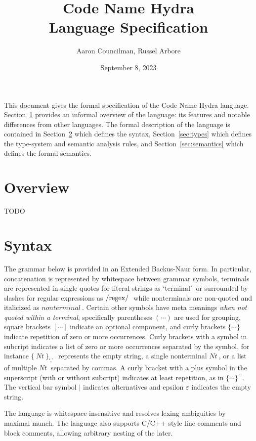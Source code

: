 \documentclass[letterpaper]{article}
\title{Code Name Hydra \\ \large Language Specification}
\author{Aaron Councilman, Russel Arbore}
\date{September 8, 2023}
\newcommand{\nonterminal}[1]{#1\ }
\newcommand{\terminal}[1]{\text{`#1'}\ }
\newcommand{\regex}[1]{\text{\lstinline$/#1/$}\ }
\newcommand*{\gramRepeat}[2][]{\{\ #2\}_{#1}\ }
\begin{document}
\maketitle

This document gives the formal specification of the Code Name Hydra language.
Section~\ref{sec:overview} provides an informal overview of the language: its features and notable differences from other languages.
The formal description of the language is contained in Section~\ref{sec:syntax} which defines the syntax, Section~\ref{sec:types} which defines the type-system and semantic analysis rules, and Section~\ref{sec:semantics} which defines the formal semantics.

\section{Overview}\label{sec:overview}
TODO

\section{Syntax}\label{sec:syntax}
The grammar below is provided in an Extended Backus-Naur form.
In particular, concatenation is represented by whitespace between grammar symbols, terminals are represented in single quotes for literal strings as $\terminal{terminal}$ or surrounded by slashes for regular expressions as $\regex{regex}$ while nonterminals are non-quoted and italicized as $\nonterminal{nonterminal}$.
Certain other symbols have meta meanings \emph{when not quoted within a terminal}, specifically parentheses $(\cdots)$ are used for grouping, square brackets $[\cdots]$ indicate an optional component, and curly brackets $\{ \cdots \}$ indicate repetition of zero or more occurrences.
Curly brackets with a symbol in subcript indicates a list of zero or more occurrences separated by the symbol, for instance $\gramRepeat[\terminal{,}]{\nonterminal{Nt}}$ represents the empty string, a single nonterminal $\nonterminal{Nt}$, or a list of multiple $\nonterminal{Nt}$ separated by commas.
A curly bracket with a plus symbol in the superscript (with or without subcript) indicates at least repetition, as in $\{ \cdots \}^{+}$.
The vertical bar symbol $\mid$ indicates alternatives and epsilon $\varepsilon$ indicates the empty string.

The language is whitespace insensitive and resolves lexing ambiguities by maximal munch.
The language also supports C/C++ style line comments and block comments, allowing arbitrary nesting of the later.
\end{document}
